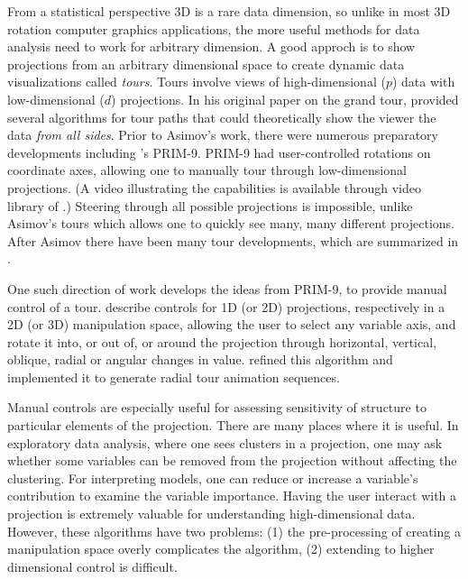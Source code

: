 \documentclass[]{interact}
\theoremstyle{plain}%
\theoremstyle{definition}
\theoremstyle{remark}
\begin{document}
From a statistical perspective 3D is a rare data dimension, so unlike in
most 3D rotation computer graphics applications, the more useful methods
for data analysis need to work for arbitrary dimension. A good approch
is to show projections from an arbitrary dimensional space to create
dynamic data visualizations called \emph{tours}. Tours involve views of
high-dimensional (\(p\)) data with low-dimensional (\(d\)) projections.
In his original paper on the grand tour, \citet{As85} provided several
algorithms for tour paths that could theoretically show the viewer the
data \emph{from all sides}. Prior to Asimov's work, there were numerous
preparatory developments including \citet{tukey}'s PRIM-9. PRIM-9 had
user-controlled rotations on coordinate axes, allowing one to manually
tour through low-dimensional projections. (A video illustrating the
capabilities is available through video library of \citet{ASA22}.)
Steering through all possible projections is impossible, unlike Asimov's
tours which allows one to quickly see many, many different projections.
After Asimov there have been many tour developments, which are
summarized in \citet{lee2021}.

One such direction of work develops the ideas from PRIM-9, to provide
manual control of a tour. \citet{cook_manual_1997} describe controls for
1D (or 2D) projections, respectively in a 2D (or 3D) manipulation space,
allowing the user to select any variable axis, and rotate it into, or
out of, or around the projection through horizontal, vertical, oblique,
radial or angular changes in value. \citet{spyrison_spinifex_2020}
refined this algorithm and implemented it to generate radial tour
animation sequences.

Manual controls are especially useful for assessing sensitivity of
structure to particular elements of the projection. There are many
places where it is useful. In exploratory data analysis, where one sees
clusters in a projection, one may ask whether some variables can be
removed from the projection without affecting the clustering. For
interpreting models, one can reduce or increase a variable's
contribution to examine the variable importance. Having the user
interact with a projection is extremely valuable for understanding
high-dimensional data. However, these algorithms have two problems: (1)
the pre-processing of creating a manipulation space overly complicates
the algorithm, (2) extending to higher dimensional control is difficult.
\end{document}
